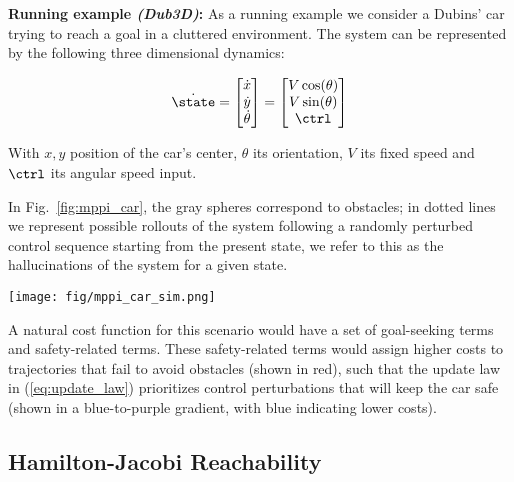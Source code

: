 \begin{mdframed}[style=MyFrame,nobreak=false]

\textbf{Running example \textit{(Dub3D)}:} 
As a running example we consider a Dubins' car trying to reach a goal in a cluttered environment. The system can be represented by the following three dimensional dynamics:

\begin{equation}\label{eq:dyn_car} 
\dot{\state}
= \begin{bmatrix} \dot{x} \\ \dot{y} \\ \dot{\theta} \end{bmatrix}
= \begin{bmatrix} V \cos(\theta) \\ V \sin(\theta) \\ \ctrl \end{bmatrix}
\end{equation}

With $x,y$ position of the car's center, $\theta$ its orientation, $V$ its fixed speed and $\ctrl$ its angular speed input.

In Fig.~\ref{fig:mppi_car}, the gray spheres correspond to obstacles; in dotted lines we represent possible rollouts of the system following a randomly perturbed control sequence starting from the present state, we refer to this as the hallucinations of the system for a given state. 

\vspace{1em}
{\centering      \texttt{[image: fig/mppi\_car\_sim.png]}
      \label{fig:mppi_car} 
\par}

A natural cost function for this scenario would have a set of goal-seeking terms and safety-related terms. These safety-related terms would assign higher costs to trajectories that fail to avoid obstacles (shown in red), such that the update law in (\ref{eq:update_law}) prioritizes control perturbations that will keep the car safe (shown in a blue-to-purple gradient, with blue indicating lower costs).

\end{mdframed}



\subsection{Hamilton-Jacobi Reachability}


